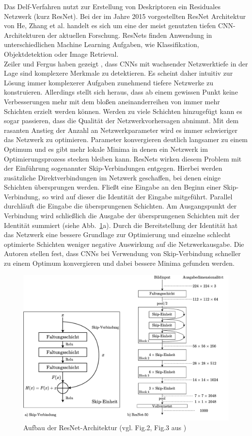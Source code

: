 Das Delf-Verfahren nutzt zur Erstellung von Deskriptoren ein Residuales Netzwerk (kurz ResNet). Bei der im Jahre 2015 vorgestellten ResNet Architektur \cite{resnet} von He, Zhang et al. handelt es sich um eine der meist genutzten tiefen CNN-Architekturen der aktuellen Forschung. ResNets finden Anwendung in unterschiedlichen Machine Learning Aufgaben, wie Klassifikation, Objektdetektion oder Image Retrieval.\\
Zeiler und Fergus haben gezeigt \cite{extraction_point_meaning}, dass CNNs mit wachsender Netzwerktiefe in der Lage sind komplexere Merkmale zu detektieren. Es scheint daher intuitiv zur Lösung immer komplexerer Aufgaben zunehmend tiefere Netzwerke zu konstruieren. Allerdings stellt sich heraus, dass ab einem gewissen Punkt keine Verbesserungen mehr mit dem bloßen aneinanderreihen von immer mehr Schichten erzielt werden können. Werden zu viele Schichten hinzugefügt kann es sogar passieren, dass die Qualität der Netzwerkvorhersagen abnimmt. Mit dem rasanten Anstieg der Anzahl an Netzwerkparameter wird es immer schwieriger das Netzwerk zu optimieren. Parameter konvergieren deutlich langsamer zu einem Optimum und es gibt mehr lokale Minima in denen ein Netzwerk im Optimierungsprozess stecken bleiben kann. ResNets wirken diesem Problem mit der Einführung sogenannter Skip-Verbindungen entgegen. Hierbei werden zusätzliche Direktverbindungen im Netzwerk geschaffen, bei denen einige Schichten übersprungen werden. Fließt eine Eingabe an den Beginn einer Skip-Verbindung, so wird auf dieser die Identität der Eingabe mitgeführt. Parallel durchläuft die Eingabe die übersprungenen Schichten. Am Ausgangspunkt der Verbindung wird schließlich die Ausgabe der übersprungenen Schichten mit der Identität summiert (siehe Abb.~\ref{resnet}a). Durch die Bereitstellung der Identität hat das Netzwerk eine bessere Grundlage zur Optimierung und einzelne schlecht optimierte Schichten weniger negative Auswirkung auf die Netzwerkausgabe. Die Autoren stellen fest, dass CNNs bei Verwendung von Skip-Verbindung schneller zu einem Optimum konvergieren und dabei bessere Minima gefunden werden. 
\\
\begin{figure}[h]
\includegraphics[scale=0.70]{resnet-50.pdf}
\caption{Aufbau der ResNet-Architektur (vgl. Fig.2, Fig.3 aus \cite{resnet})}
\label{resnet}
\end{figure}
